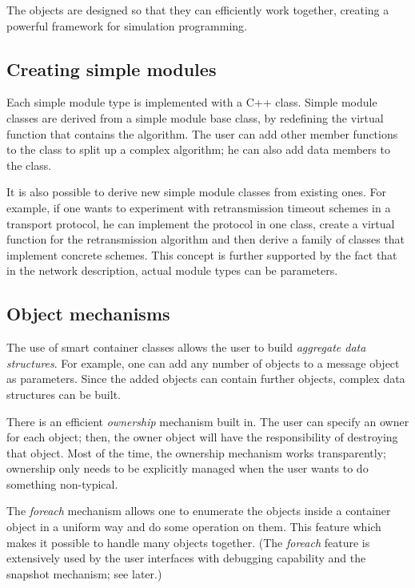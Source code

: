 The objects are designed so that they can efficiently work together,
creating a powerful framework for simulation programming.


\subsection{Creating simple modules}

Each simple module type is implemented with a C++ class. Simple
module classes are derived from a simple module base class, by
redefining the virtual function that contains the algorithm.
The user can add other member functions to the class to split
up a complex algorithm; he can also add data members to the class.

It is also possible to derive new simple module classes from
existing ones. For example, if one wants to experiment with retransmission
timeout schemes in a transport protocol, he can implement the
protocol in one class, create a virtual function for the retransmission
algorithm and then derive a family of classes that implement
concrete schemes. This concept is further supported by the fact
that in the network description, actual module types can be parameters.


\subsection{Object mechanisms}

The use of smart container classes allows the user to build
\textit{aggregate data structures}.
For example, one can add any number of objects to a message object as
parameters. Since the added objects can contain further objects,
complex data structures can be built.

There is an efficient \textit{ownership} mechanism
built in. The user can specify an owner for each object; then, the
owner object will have the responsibility of destroying that object.
Most of the time, the ownership mechanism works transparently;
ownership only needs to be explicitly managed when the user wants to
do something non-typical.


The \textit{foreach} mechanism allows one to
enumerate the objects inside a container object in a uniform way and
do some operation on them. This feature which makes it possible to
handle many objects together. (The \textit{foreach} feature is extensively used
by the user interfaces with debugging capability and the snapshot
mechanism; see later.)


